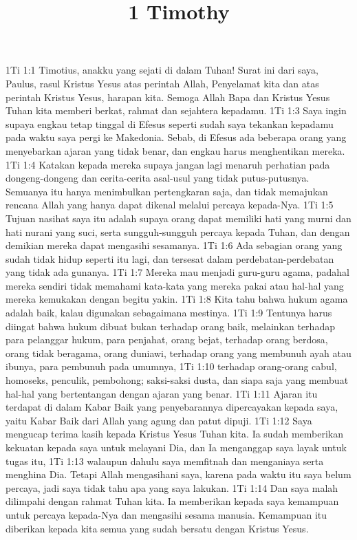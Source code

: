 

\title{1 Timothy}

1Ti 1:1  Timotius, anakku yang sejati di dalam Tuhan! Surat ini dari saya, Paulus, rasul Kristus Yesus atas perintah Allah, Penyelamat kita dan atas perintah Kristus Yesus, harapan kita. Semoga Allah Bapa dan Kristus Yesus Tuhan kita memberi berkat, rahmat dan sejahtera kepadamu.
1Ti 1:3  Saya ingin supaya engkau tetap tinggal di Efesus seperti sudah saya tekankan kepadamu pada waktu saya pergi ke Makedonia. Sebab, di Efesus ada beberapa orang yang menyebarkan ajaran yang tidak benar, dan engkau harus menghentikan mereka.
1Ti 1:4  Katakan kepada mereka supaya jangan lagi menaruh perhatian pada dongeng-dongeng dan cerita-cerita asal-usul yang tidak putus-putusnya. Semuanya itu hanya menimbulkan pertengkaran saja, dan tidak memajukan rencana Allah yang hanya dapat dikenal melalui percaya kepada-Nya.
1Ti 1:5  Tujuan nasihat saya itu adalah supaya orang dapat memiliki hati yang murni dan hati nurani yang suci, serta sungguh-sungguh percaya kepada Tuhan, dan dengan demikian mereka dapat mengasihi sesamanya.
1Ti 1:6  Ada sebagian orang yang sudah tidak hidup seperti itu lagi, dan tersesat dalam perdebatan-perdebatan yang tidak ada gunanya.
1Ti 1:7  Mereka mau menjadi guru-guru agama, padahal mereka sendiri tidak memahami kata-kata yang mereka pakai atau hal-hal yang mereka kemukakan dengan begitu yakin.
1Ti 1:8  Kita tahu bahwa hukum agama adalah baik, kalau digunakan sebagaimana mestinya.
1Ti 1:9  Tentunya harus diingat bahwa hukum dibuat bukan terhadap orang baik, melainkan terhadap para pelanggar hukum, para penjahat, orang bejat, terhadap orang berdosa, orang tidak beragama, orang duniawi, terhadap orang yang membunuh ayah atau ibunya, para pembunuh pada umumnya,
1Ti 1:10  terhadap orang-orang cabul, homoseks, penculik, pembohong; saksi-saksi dusta, dan siapa saja yang membuat hal-hal yang bertentangan dengan ajaran yang benar.
1Ti 1:11  Ajaran itu terdapat di dalam Kabar Baik yang penyebarannya dipercayakan kepada saya, yaitu Kabar Baik dari Allah yang agung dan patut dipuji.
1Ti 1:12  Saya mengucap terima kasih kepada Kristus Yesus Tuhan kita. Ia sudah memberikan kekuatan kepada saya untuk melayani Dia, dan Ia menganggap saya layak untuk tugas itu,
1Ti 1:13  walaupun dahulu saya memfitnah dan menganiaya serta menghina Dia. Tetapi Allah mengasihani saya, karena pada waktu itu saya belum percaya, jadi saya tidak tahu apa yang saya lakukan.
1Ti 1:14  Dan saya malah dilimpahi dengan rahmat Tuhan kita. Ia memberikan kepada saya kemampuan untuk percaya kepada-Nya dan mengasihi sesama manusia. Kemampuan itu diberikan kepada kita semua yang sudah bersatu dengan Kristus Yesus.
